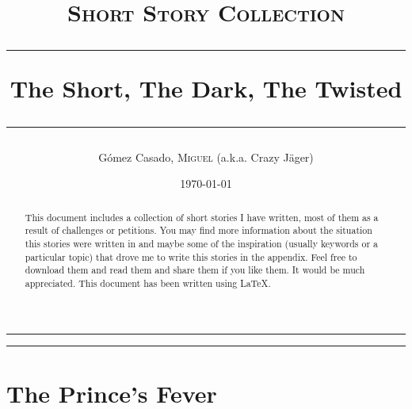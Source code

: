 \documentclass[a4paper,onecolumn,11pt]{article}
\title{
\textsc{\normalsize Short Story Collection} \\
\vspace{1cm}
\hrule
\vspace{0.4cm}
The Short, The Dark, The Twisted
\vspace{0.5cm}
\hrule
}
\author{Gómez Casado, \textsc{Miguel} (a.k.a. Crazy Jäger) }
\date{\today}
\begin{document}
\maketitle %

\begin{abstract}
This document includes a collection of short stories I have written, most of them as a result of challenges or petitions. You may find more information about the situation this stories were written in and maybe some of the inspiration (usually keywords or a particular topic) that drove me to write this stories in the appendix. Feel free to download them and read them and share them if you like them. It would be much appreciated. This document has been written using LaTeX. 
\end{abstract}

\newpage

\hrule

\tableofcontents %

\hrule

\newpage



\section{The Prince's Fever}
\end{document}
